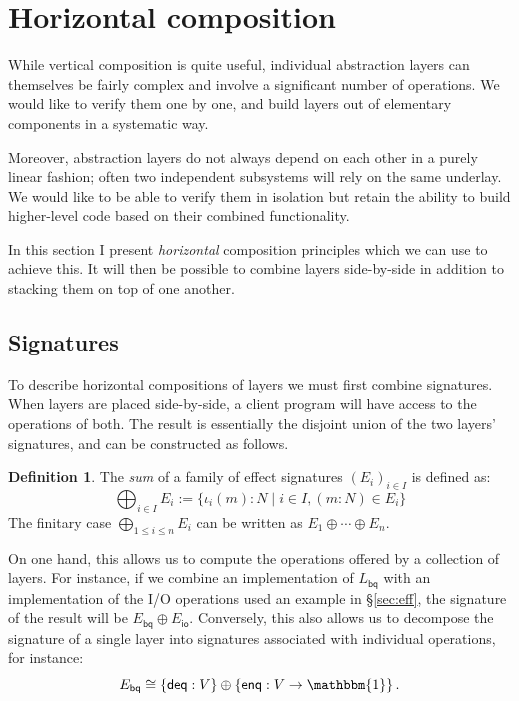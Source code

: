 \documentclass[11pt,oneside]{book}
\theoremstyle{definition}
\newtheorem{definition}[theorem]{Definition}
\newcommand{\kw}[1]{\ensuremath{ \mathsf{#1} }}
\begin{document}


\section{Horizontal composition} %

While vertical composition is quite useful,
individual abstraction layers can themselves be fairly complex
and involve a significant number of operations.
We would like to verify them one by one,
and build layers out of elementary components
in a systematic way.

Moreover,
abstraction layers do not always depend on each other
in a purely linear fashion;
often two independent subsystems will rely on the same underlay.
We would like to be able to verify them in isolation
but retain the ability to build higher-level code
based on their combined functionality.

In this section I present \emph{horizontal} composition principles
which we can use to achieve this.
It will then be possible to combine layers
side-by-side in addition to stacking them
on top of one another.

\subsection{Signatures} \label{sec:hcomp:sig} %

To describe horizontal compositions of layers
we must first combine signatures.
When layers are placed side-by-side,
a client program will have access to
the operations of both.
The result is essentially
the disjoint union of the two layers' signatures,
and can be constructed as follows.

\begin{definition} \label{def:sigsum}
The \emph{sum} of a family of effect signatures $(E_i)_{i \in I}$
is defined as:
\[
  \bigoplus_{i \in I} E_i :=
    \{ \iota_i(m) \mathbin: N \mid i \in I, (m \mathbin: N) \in E_i \}
\]
The finitary case $\bigoplus_{1 \le i \le n} E_i$
can be written as $E_1 \oplus \cdots \oplus E_n$.
\end{definition}

On one hand,
this allows us to compute
the operations offered by a collection of layers.
For instance,
if we combine an implementation of $L_\kw{bq}$
with an implementation of the I/O operations
used an example in \S\ref{sec:eff},
the signature of the result will be $E_\kw{bq} \oplus E_\kw{io}$.
Conversely,
this also allows us to decompose the signature
of a single layer into signatures associated with
individual operations,
for instance:
\[
  E_\kw{bq} \cong
    \{ \kw{deq} : V \} \oplus \{ \kw{enq} : V \rightarrow \mathbbm{1} \}
  \,.
\]
\end{document}
